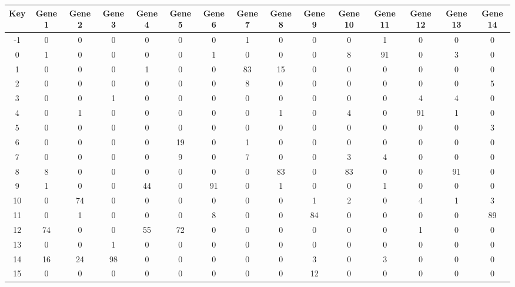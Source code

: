 \begin{tabular}{|c|c|c|c|c|c|c|c|c|c|c|c|c|c|c|}
\hline
Key & Gene 1 & Gene 2 & Gene 3 & Gene 4 & Gene 5 & Gene 6 & Gene 7 & Gene 8 & Gene 9 & Gene 10 & Gene 11 & Gene 12 & Gene 13 & Gene 14 \\
\hline
-1 & 0 & 0 & 0 & 0 & 0 & 0 & 1 & 0 & 0 & 0 & 1 & 0 & 0 & 0 \\
0 & 1 & 0 & 0 & 0 & 0 & 1 & 0 & 0 & 0 & 8 & 91 & 0 & 3 & 0 \\
1 & 0 & 0 & 0 & 1 & 0 & 0 & 83 & 15 & 0 & 0 & 0 & 0 & 0 & 0 \\
2 & 0 & 0 & 0 & 0 & 0 & 0 & 8 & 0 & 0 & 0 & 0 & 0 & 0 & 5 \\
3 & 0 & 0 & 1 & 0 & 0 & 0 & 0 & 0 & 0 & 0 & 0 & 4 & 4 & 0 \\
4 & 0 & 1 & 0 & 0 & 0 & 0 & 0 & 1 & 0 & 4 & 0 & 91 & 1 & 0 \\
5 & 0 & 0 & 0 & 0 & 0 & 0 & 0 & 0 & 0 & 0 & 0 & 0 & 0 & 3 \\
6 & 0 & 0 & 0 & 0 & 19 & 0 & 1 & 0 & 0 & 0 & 0 & 0 & 0 & 0 \\
7 & 0 & 0 & 0 & 0 & 9 & 0 & 7 & 0 & 0 & 3 & 4 & 0 & 0 & 0 \\
8 & 8 & 0 & 0 & 0 & 0 & 0 & 0 & 83 & 0 & 83 & 0 & 0 & 91 & 0 \\
9 & 1 & 0 & 0 & 44 & 0 & 91 & 0 & 1 & 0 & 0 & 1 & 0 & 0 & 0 \\
10 & 0 & 74 & 0 & 0 & 0 & 0 & 0 & 0 & 1 & 2 & 0 & 4 & 1 & 3 \\
11 & 0 & 1 & 0 & 0 & 0 & 8 & 0 & 0 & 84 & 0 & 0 & 0 & 0 & 89 \\
12 & 74 & 0 & 0 & 55 & 72 & 0 & 0 & 0 & 0 & 0 & 0 & 1 & 0 & 0 \\
13 & 0 & 0 & 1 & 0 & 0 & 0 & 0 & 0 & 0 & 0 & 0 & 0 & 0 & 0 \\
14 & 16 & 24 & 98 & 0 & 0 & 0 & 0 & 0 & 3 & 0 & 3 & 0 & 0 & 0 \\
15 & 0 & 0 & 0 & 0 & 0 & 0 & 0 & 0 & 12 & 0 & 0 & 0 & 0 & 0 \\
\hline
\end{tabular}